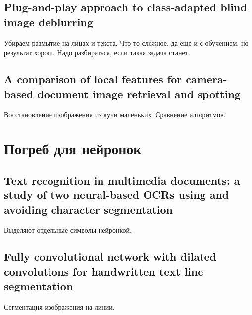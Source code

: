 \documentclass[12pt]{article}
\begin{document}
\subsection{Plug-and-play approach to class-adapted blind image deblurring}
Убираем размытие на лицах и текста. Что-то сложное, да еще и с обучением, но результат хорош.
Надо разбираться, если такая задача станет.


\subsection{A comparison of local features for camera-based document image retrieval and spotting}
Восстановление изображения из кучи маленьких. Сравнение алгоритмов. 



\section{Погреб для нейронок}


\subsection{Text recognition in multimedia documents: a study of two neural-based OCRs using and avoiding character segmentation}
Выделяют отдельные символы нейронкой.


\subsection{Fully convolutional network with dilated convolutions for handwritten text line segmentation}
Сегментация изображения на линии.
\end{document}
